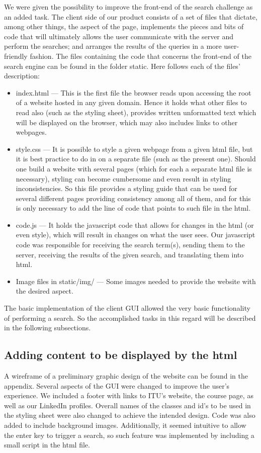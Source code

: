 We were given the possibility to improve the front-end of the search challenge as an added task. The client side of our product consists of a set of files that dictate, among other things, the aspect of the page, implements the pieces and bits of code that will ultimately allows the user communicate with the server and perform the searches; and arranges the results of the queries in a more user-friendly fashion.\newline
The files containing the code that concerns the front-end of the search engine can be found in the folder static. Here follows each of the files' description:
\begin{itemize}
    \item index.html — This is the first file the browser reads upon accessing the root of a website hosted in any given domain. Hence it holds what other files to read also (such as the styling sheet), provides written unformatted text which will be displayed on the browser, which may also includes links to other webpages.
    \item style.css — It is possible to style a given webpage from a given html file, but it is best practice to do in on a separate file (such as the present one). Should one build a website with several pages (which for each a separate html file is necessary), styling can become cumbersome and even result in styling inconsistencies. So this file provides a styling guide that can be used for several different pages providing consistency among all of them, and for this is only necessary to add the line of code that points to such file in the html.
    \item code.js — It holds the javascript code that allows for changes in the html (or even style), which will result in changes on what the user sees. Our javascript code was responsible for receiving the search term(s), sending them to the server, receiving the results of the given search, and translating them into html.
    \item Image files in static/img/ — Some images needed to provide the website with the desired aspect.
\end{itemize}
The basic implementation of the client GUI allowed the very basic functionality of performing a search. So the accomplished tasks in this regard will be described in the following subsections.

\subsection{Adding content to be displayed by the html}
A wireframe of a preliminary graphic design of the website can be found in the appendix. Several aspects of the GUI were changed to improve the user's experience. We included a footer with links to ITU's website, the course page, as well as our LinkedIn profiles. Overall names of the classes and id's to be used in the styling sheet were also changed to achieve the intended design. Code was also added to include background images.
Additionally, it seemed intuitive to allow the enter key to trigger a search, so such feature was implemented by including a small script in the html file.


